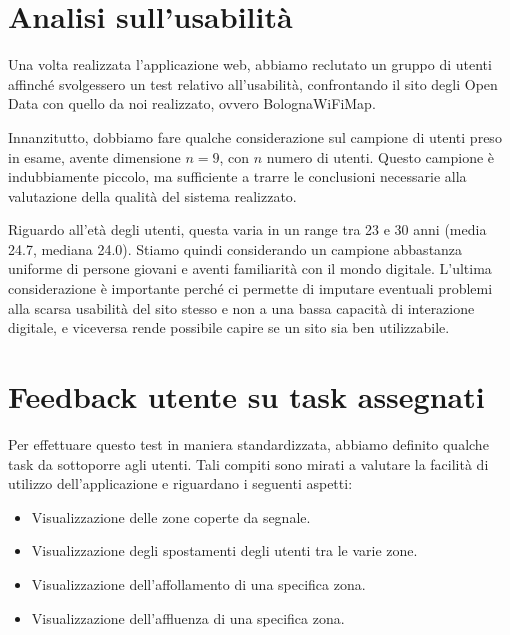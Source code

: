 \section{Analisi sull'usabilità}


Una volta realizzata l'applicazione web, abbiamo reclutato un gruppo di utenti affinché svolgessero un test relativo all'usabilità, confrontando il sito degli Open Data con quello da noi realizzato, ovvero BolognaWiFiMap.

Innanzitutto, dobbiamo fare qualche considerazione sul campione di utenti preso in esame, avente dimensione \( n = 9 \), con \( n \) numero di utenti. Questo campione è indubbiamente piccolo, ma sufficiente a trarre le conclusioni necessarie alla valutazione della qualità del sistema realizzato.

Riguardo all'età degli utenti, questa varia in un range tra 23 e 30 anni (media 24.7, mediana 24.0). Stiamo quindi considerando un campione abbastanza uniforme di persone giovani e aventi familiarità con il mondo digitale. L'ultima considerazione è importante perché ci permette di imputare eventuali problemi alla scarsa usabilità del sito stesso e non a una bassa capacità di interazione digitale, e viceversa rende possibile capire se un sito sia ben utilizzabile.

\section{Feedback utente su task assegnati}
Per effettuare questo test in maniera standardizzata, abbiamo definito qualche task da sottoporre agli utenti. Tali compiti sono mirati a valutare la facilità di utilizzo dell'applicazione e riguardano i seguenti aspetti:
\begin{itemize}
    \item Visualizzazione delle zone coperte da segnale.
    \item Visualizzazione degli spostamenti degli utenti tra le varie zone.
    \item Visualizzazione dell'affollamento di una specifica zona.
    \item Visualizzazione dell'affluenza di una specifica zona.
\end{itemize}

